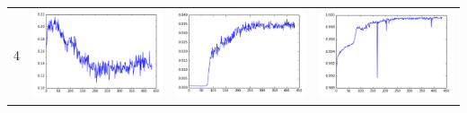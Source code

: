 \documentclass[14pt, a4paper]{extarticle}
\begin{document}
\begin{table}[!htb]
{\begin{tabular}{|c|c|c|c|}
\hline
4 & \includegraphics[scale=0.3]{images/ks_4.png} & \includegraphics[scale=0.3]{images/cvm_4.png} & \includegraphics[scale=0.3]{images/auc_4.png} \\

\end{tabular}}
\end{table}
\end{document}
